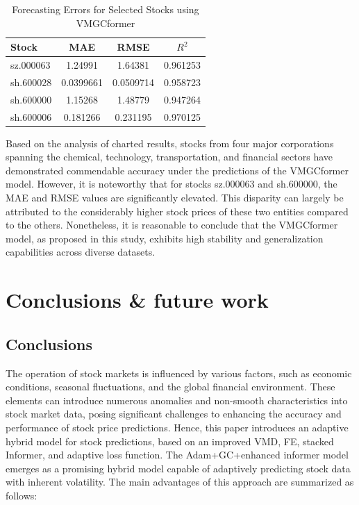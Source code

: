 \documentclass[sn-mathphys,Numbered]{sn-jnl}
\theoremstyle{thmstyleone}%
\theoremstyle{thmstyletwo}%
\theoremstyle{thmstylethree}%
\begin{document}
\begin{table}[h]
\caption{Forecasting Errors for Selected Stocks using VMGCformer}\label{error_stable}
\centering
\begin{tabular}{@{}lccc@{}}
\toprule
\textbf{Stock} & \textbf{MAE} & \textbf{RMSE} & \textbf{\(R^2\)} \\
\midrule
sz.000063 & 1.24991 & 1.64381 & 0.961253 \\
sh.600028 & 0.0399661 & 0.0509714 & 0.958723 \\
sh.600000 & 1.15268 & 1.48779 & 0.947264 \\
sh.600006 & 0.181266 & 0.231195 & 0.970125 \\
\bottomrule
\end{tabular}
\end{table}

Based on the analysis of charted results, stocks from four major corporations spanning the chemical, technology, transportation, and financial sectors have demonstrated commendable accuracy under the predictions of the VMGCformer model. However, it is noteworthy that for stocks sz.000063 and sh.600000, the MAE and RMSE values are significantly elevated. This disparity can largely be attributed to the considerably higher stock prices of these two entities compared to the others. Nonetheless, it is reasonable to conclude that the VMGCformer model, as proposed in this study, exhibits high stability and generalization capabilities across diverse datasets.


\section{Conclusions \& future work}\label{sec5}
\subsection{Conclusions}\label{sec5.1}
The operation of stock markets is influenced by various factors, such as economic conditions, seasonal fluctuations, and the global financial environment. These elements can introduce numerous anomalies and non-smooth characteristics into stock market data, posing significant challenges to enhancing the accuracy and performance of stock price predictions. Hence, this paper introduces an adaptive hybrid model for stock predictions, based on an improved VMD, FE, stacked Informer, and adaptive loss function. The Adam+GC+enhanced informer model emerges as a promising hybrid model capable of adaptively predicting stock data with inherent volatility. The main advantages of this approach are summarized as follows:
\end{document}

